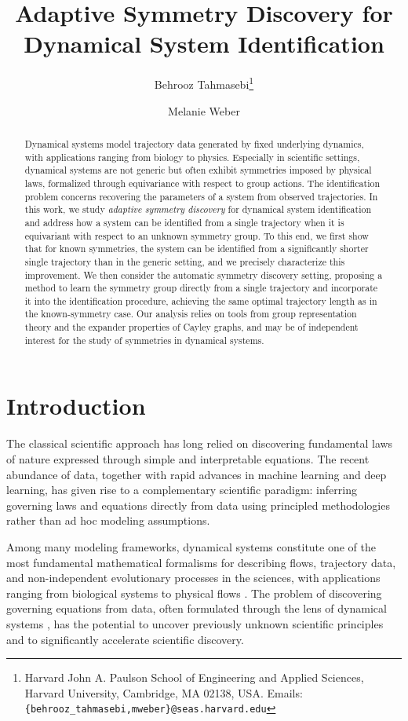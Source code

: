 \documentclass[11pt]{article}
\title{Adaptive Symmetry Discovery for Dynamical System Identification}
\author{
Behrooz Tahmasebi\footnote{Harvard John A. Paulson School of Engineering and Applied Sciences, Harvard University, Cambridge, MA 02138, USA. Emails: \texttt{\{behrooz\_tahmasebi,mweber\}@seas.harvard.edu}}
\and
Melanie Weber\footnotemark[1]
}
\date{}
\theoremstyle{plain}
\theoremstyle{definition}
\theoremstyle{remark}
\begin{document}
\maketitle

 
\begin{abstract}
Dynamical systems model trajectory data generated by fixed underlying dynamics, with applications ranging from biology to physics.  Especially in scientific settings, dynamical systems are not generic but often exhibit symmetries imposed by physical laws, formalized through equivariance with respect to group actions. The identification problem concerns recovering the parameters of a system from observed trajectories.  In this work, we study \emph{adaptive symmetry discovery} for dynamical system identification and address how a system can be identified from a single trajectory when it is equivariant with respect to an unknown symmetry group. To this end, we first show that for known symmetries, the system can be identified from a significantly shorter single trajectory than in the generic setting, and we precisely characterize this improvement. 
We then consider the automatic symmetry discovery setting, proposing a method to learn the symmetry group directly from a single trajectory and incorporate it into the identification procedure, achieving the same optimal trajectory length as in the known-symmetry case. Our analysis relies on tools from group representation theory and the expander properties of Cayley graphs, and may be of independent interest for the study of symmetries in dynamical systems.
\end{abstract} 



\clearpage

\tableofcontents

\section{Introduction}



The classical scientific approach has long relied on discovering fundamental laws of nature expressed through simple and interpretable equations. The recent abundance of data, together with rapid advances in machine learning and deep learning, has given rise to a complementary scientific paradigm: inferring governing laws and equations directly from data using principled methodologies rather than ad hoc modeling assumptions.

Among many modeling frameworks, dynamical systems constitute one of the most fundamental mathematical formalisms for describing flows, trajectory data, and non-independent evolutionary processes in the sciences, with applications ranging from biological systems to physical flows \citep{brunton2016discovering, yu2024learning, wang2025physics}. The problem of discovering governing equations from data, often formulated through the lens of dynamical systems \citep{brunton2016discovering}, has the potential to uncover previously unknown scientific principles and to significantly accelerate scientific discovery.
\end{document}
